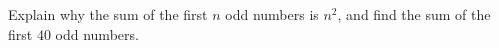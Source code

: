 Explain why the sum of the first $n$ odd numbers is $n^2$, and find the sum of the first $40$ odd numbers.
